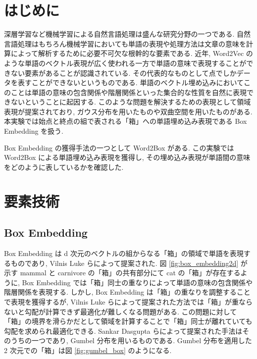 \documentclass[twocolumn]{jarticle}     %
\begin{document}

\section{はじめに}
深層学習など機械学習による自然言語処理は盛んな研究分野の一つである. 
自然言語処理はもちろん機械学習においても単語の表現や処理方法は文章の意味を計算によって解析するために必要不可欠な根幹的な要素である.
近年, Word2Vec のような単語のベクトル表現が広く使われる一方で単語の意味で表現することができない要素があることが認識されている. 
その代表的なものとして点でしかデータを表すことができないというものである. 
単語のベクトル埋め込みにおいてこのことは単語の意味の包含関係や階層関係といった集合的な性質を自然に表現できないということに起因する. 
このような問題を解決するための表現として領域表現が提案されており, ガウス分布を用いたものや双曲空間を用いたものがある. 
本実験では始点と終点の組で表される「箱」への単語埋め込み表現である Box Embedding を扱う. 

Box Embedding の獲得手法の一つとして Word2Box がある. 
この実験では Word2Box による単語埋め込み表現を獲得し, その埋め込み表現が単語間の意味をどのように表しているかを確認した. 

\section{要素技術}
\subsection{Box Embedding}
Box Embedding は d 次元のベクトルの組からなる「箱」の領域で単語を表現するものであり, Vilnis Luke ら\cite{box-lattice}によって提案された. 
図 \ref{fig:box_embedding2d} が示す mammal と carnivore の「箱」の共有部分にて cat の「箱」が存在するように, Box Embedding では「箱」同士の重なりによって単語の意味の包含関係や階層関係を表現する. 
しかし, Box Embedding は「箱」の重なりを調整することで表現を獲得するが, Vilnis Luke らによって提案された方法では「箱」が重ならないと勾配が計算できず最適化が難しくなる問題がある.
この問題に対して「箱」の境界を滑らかだとして領域を計算することで「箱」同士が離れていても勾配を求められ最適化できる. 
Sankar Dasgupta ら\cite{gumbel-box}によって提案された手法はそのうちの一つであり, Gumbel 分布を用いるものである. 
Gumbel 分布を適用した 2 次元での「箱」は図 \ref{fig:gumbel_box} のようになる. 
\end{document}
